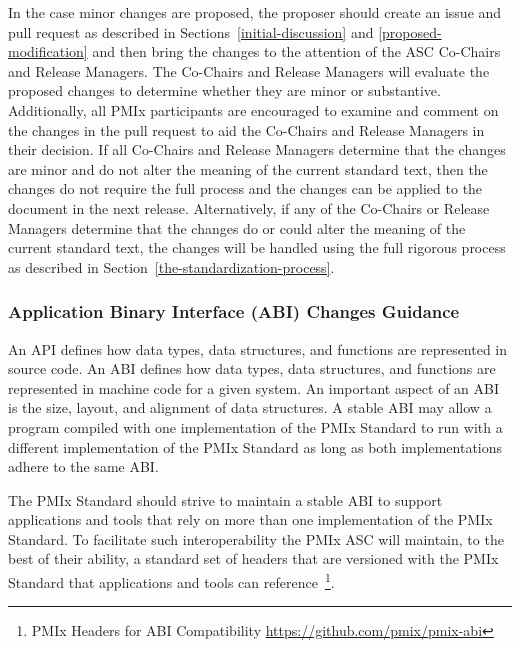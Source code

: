 \documentclass{article}
\begin{document}
In the case minor changes are proposed, the proposer should 
create an issue and pull request as described in Sections~\ref{initial-discussion}
and \ref{proposed-modification} and then bring the
changes to the attention of the ASC Co-Chairs and Release Managers.
The Co-Chairs and Release Managers will evaluate the proposed
changes to determine whether they are minor or substantive.
Additionally, all PMIx participants are encouraged to examine
and comment on the changes in the pull request to aid the
Co-Chairs and Release Managers in their decision.
If all Co-Chairs and Release Managers determine that the
changes are minor and do not alter the meaning of the current standard text, 
then the changes do not require the full process and
the changes can be applied to the document in the next release.
Alternatively, if any of the Co-Chairs or Release Managers determine 
that the changes do or could alter the meaning of the current standard text, 
the changes will be handled using the full rigorous process
as described in Section~\ref{the-standardization-process}.

\hypertarget{abi-changes-guidance}{%
\subsubsection{Application Binary Interface (ABI) Changes Guidance}%
\label{abi-changes-guidance}}

An \acf{API} defines how data types, data structures, and functions are represented in source code.
An \acf{ABI} defines how data types, data structures, and functions are represented in machine code for a given system.
An important aspect of an \ac{ABI} is the size, layout, and alignment of data structures.
A stable \ac{ABI} may allow a program compiled with one implementation of the PMIx Standard to run with a different implementation of the PMIx Standard as long as both implementations adhere to the same \ac{ABI}.

The PMIx Standard should strive to maintain a stable \ac{ABI} to support applications and tools that rely on more than one implementation of the PMIx Standard.
To facilitate such interoperability the PMIx \ac{ASC} will maintain, to the best of their ability, a standard set of headers that are versioned with the PMIx Standard that applications and tools can reference~\footnote{PMIx Headers for ABI Compatibility \url{https://github.com/pmix/pmix-abi}}.
\end{document}
